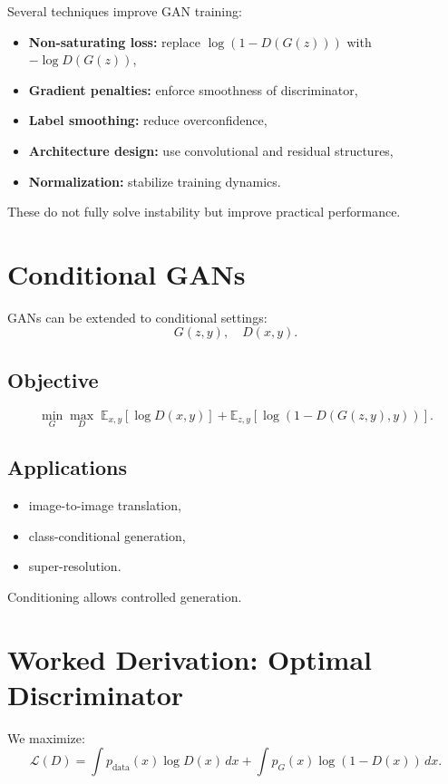 Several techniques improve GAN training:

\begin{itemize}
    \item \textbf{Non-saturating loss:} replace $\log(1-D(G(z)))$ with $-\log D(G(z))$,
    \item \textbf{Gradient penalties:} enforce smoothness of discriminator,
    \item \textbf{Label smoothing:} reduce overconfidence,
    \item \textbf{Architecture design:} use convolutional and residual structures,
    \item \textbf{Normalization:} stabilize training dynamics.
\end{itemize}

These do not fully solve instability but improve practical performance.

\section{Conditional GANs}

GANs can be extended to conditional settings:
\[
G(z, y), \quad D(x, y).
\]

\subsection{Objective}

\[
\min_G \max_D \;
\mathbb{E}_{x,y}[\log D(x,y)]
+
\mathbb{E}_{z,y}[\log(1 - D(G(z,y), y))].
\]

\subsection{Applications}

\begin{itemize}
    \item image-to-image translation,
    \item class-conditional generation,
    \item super-resolution.
\end{itemize}

Conditioning allows controlled generation.

\section{Worked Derivation: Optimal Discriminator}

We maximize:
\[
\mathcal{L}(D)
=
\int p_{\text{data}}(x)\log D(x)\,dx
+
\int p_G(x)\log(1-D(x))\,dx.
\]

